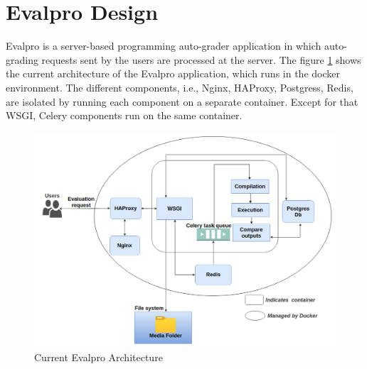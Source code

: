 \documentclass{iitbreport}
\begin{document}
\section{Evalpro Design}\label{evalpro_design}
Evalpro is a server-based programming auto-grader application in which auto-grading requests sent by the users are processed at the server. The figure \ref{fig:evalpro_arch} shows the current architecture of the Evalpro application, which runs in the docker  environment. The different components, i.e., Nginx, HAProxy, Postgress, Redis, are isolated by running each component on a separate container. Except for that WSGI, Celery components run on the same container.
\begin{figure}[!htb]
            \centering
            \includegraphics[width=\linewidth]{Images/evalpro_architecture_current.png}
            \caption{Current Evalpro Architecture}
            \label{fig:evalpro_arch}
\end{figure}
\end{document}

